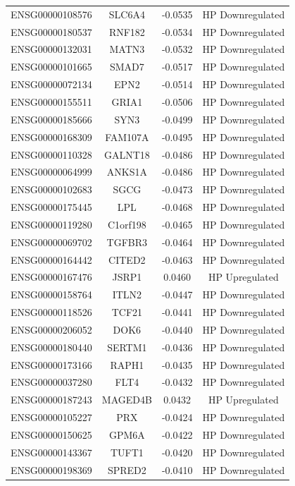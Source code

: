 \documentclass[
]{article}
\begin{document}
\begin{singlespace}
\begin{longtable}[t]{lccc}
ENSG00000108576 & SLC6A4 & -0.0535 & HP Downregulated\\
ENSG00000180537 & RNF182 & -0.0534 & HP Downregulated\\
ENSG00000132031 & MATN3 & -0.0532 & HP Downregulated\\
ENSG00000101665 & SMAD7 & -0.0517 & HP Downregulated\\
\addlinespace
ENSG00000072134 & EPN2 & -0.0514 & HP Downregulated\\
ENSG00000155511 & GRIA1 & -0.0506 & HP Downregulated\\
ENSG00000185666 & SYN3 & -0.0499 & HP Downregulated\\
ENSG00000168309 & FAM107A & -0.0495 & HP Downregulated\\
ENSG00000110328 & GALNT18 & -0.0486 & HP Downregulated\\
\addlinespace
ENSG00000064999 & ANKS1A & -0.0486 & HP Downregulated\\
ENSG00000102683 & SGCG & -0.0473 & HP Downregulated\\
ENSG00000175445 & LPL & -0.0468 & HP Downregulated\\
ENSG00000119280 & C1orf198 & -0.0465 & HP Downregulated\\
ENSG00000069702 & TGFBR3 & -0.0464 & HP Downregulated\\
\addlinespace
ENSG00000164442 & CITED2 & -0.0463 & HP Downregulated\\
ENSG00000167476 & JSRP1 & 0.0460 & HP Upregulated\\
ENSG00000158764 & ITLN2 & -0.0447 & HP Downregulated\\
ENSG00000118526 & TCF21 & -0.0441 & HP Downregulated\\
ENSG00000206052 & DOK6 & -0.0440 & HP Downregulated\\
\addlinespace
ENSG00000180440 & SERTM1 & -0.0436 & HP Downregulated\\
ENSG00000173166 & RAPH1 & -0.0435 & HP Downregulated\\
ENSG00000037280 & FLT4 & -0.0432 & HP Downregulated\\
ENSG00000187243 & MAGED4B & 0.0432 & HP Upregulated\\
ENSG00000105227 & PRX & -0.0424 & HP Downregulated\\
\addlinespace
ENSG00000150625 & GPM6A & -0.0422 & HP Downregulated\\
ENSG00000143367 & TUFT1 & -0.0420 & HP Downregulated\\
ENSG00000198369 & SPRED2 & -0.0410 & HP Downregulated\\

\end{longtable}
\end{singlespace}
\end{document}
